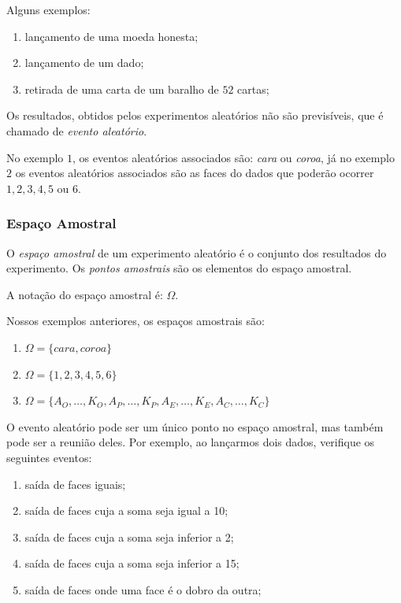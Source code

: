 \documentclass[oneside,a4paper,12pt]{article}
\begin{document}
 Alguns exemplos:
{\begin{enumerate}
	\item lançamento de uma moeda honesta;
	\item lançamento de um dado;
	\item retirada de uma carta de um baralho de $52$ cartas;
\end{enumerate}}


  Os resultados, obtidos pelos experimentos aleatórios não são previsíveis, que é chamado de {\it evento aleatório}.

  No exemplo $1$, os eventos aleatórios associados são: {\it cara} ou {\it coroa}, já no exemplo $2$ os eventos aleatórios associados são as faces do dados que poderão ocorrer $1, 2, 3, 4, 5$ ou $6$.

\subsubsection{Espaço Amostral}

 O {\it espaço amostral} de um experimento aleatório é o conjunto dos resultados do experimento. Os {\it pontos amostrais} são os elementos do espaço amostral. 

 A notação do espaço amostral é: $\Omega$.

 Nossos exemplos anteriores, os espaços amostrais são:
\begin{enumerate}
	\item $\Omega = \{ cara, coroa \}$
	\item $\Omega = \{ 1,2,3,4,5,6 \}$
	\item $\Omega = \{ A_O,\dots,K_O, A_P,\dots,K_P, A_E,\dots, K_E, A_C,\dots, K_C \}$
\end{enumerate}


 O evento aleatório pode ser um único ponto no espaço amostral, mas também pode ser a reunião deles. Por exemplo, ao lançarmos dois dados, verifique os seguintes eventos:

\begin{enumerate}
	\item saída de faces iguais;
	\item saída de faces cuja a soma seja igual a 10;
	\item saída de faces cuja a soma seja inferior a 2;
	\item saída de faces cuja a soma seja inferior a 15;
	\item saída de faces onde uma  face é o dobro da outra;
\end{enumerate}
\end{document}
